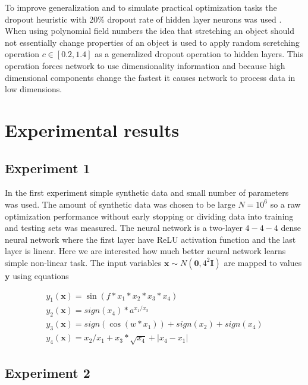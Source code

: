 \documentclass[preprint,12pt]{elsarticle}
\begin{document}
To improve generalization and to simulate practical optimization tasks the dropout heuristic with 20\% dropout rate of hidden layer neurons was used \cite{dropoutarticle}. When using polynomial field numbers the idea that stretching an object should not essentially change properties of an object is used to apply random scretching operation $c \in [0.2,1.4]$ as a generalized dropout operation to hidden layers. This operation forces network to use dimensionality information and because high dimensional components change the fastest it causes network to process data in low dimensions.

\section{Experimental results}
\label{experiemnts}

\subsection{Experiment 1}
\label{experiment1}

In the first experiment simple synthetic data and small number of parameters was used. The amount of synthetic data was chosen to be large $N=10^6$ so a raw optimization performance without early stopping or dividing data into training and testing sets was measured. The neural network is a two-layer $4-4-4$ dense neural network where the first layer have ReLU activation function and the last layer is linear. Here we are interested how much better neural network learns simple non-linear task. The input variables $\mathbf{x}\sim N(\mathbf{0},4^2\mathbf{I})$ are mapped to values $\mathbf{y}$ using equations

\begin{equation}
  \begin{gathered}
    y_1(\mathbf{x}) = \sin(f*x_1*x_2*x_3*x_4) \\
    y_2(\mathbf{x}) = sign(x_4)*a^{x_1/x_3} \\
    y_3(\mathbf{x}) = sign(\cos(w*x_1)) + sign(x_2) + sign(x_4) \\
    y_4(\mathbf{x}) = x_2/x_1 + x_3*\sqrt{x_4} + |x_4-x_1|
  \end{gathered}
\end{equation}
  
\subsection{Experiment 2}
\label{experiment2}
\end{document}
